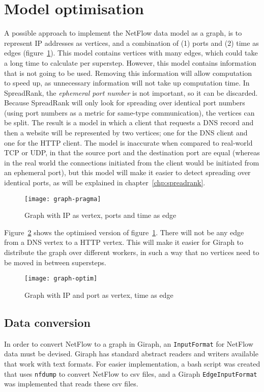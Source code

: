 \section{Model optimisation}
\label{sec:model_optimisation}

A possible approach to implement the NetFlow data model as a graph, is to represent IP addresses as vertices, and a combination of (1) ports and (2) time as edges (figure~\ref{fig:graph-pragma}).
This model contains vertices with many edges, which could take a long time to calculate per superstep.
However, this model contains information that is not going to be used.
Removing this information will allow computation to speed up, as unnecessary information will not take up computation time.
In SpreadRank, the \emph{\gls{ephemeral port} number} is not important,
 so it can be discarded.
Because SpreadRank will only look for \gls{spreading} over identical port numbers (using port numbers as a metric for same-type communication),
 the vertices can be split.
The result is a model in which a client that requests a DNS record and then a website will be represented by two vertices;
 one for the DNS client and one for the HTTP client.
The model is inaccurate when compared to real-world TCP or UDP, in that the source port and the destination port are equal
 (whereas in the real world the connections initiated from the client would be initiated from an \gls{ephemeral port}),
 but this model will make it easier to detect \gls{spreading} over identical ports, as will be explained in chapter~\ref{chp:spreadrank}.

\begin{figure}[h]
	\caption{Graph with IP as vertex, ports and time as edge}
	\label{fig:graph-pragma}
	\centering
		\texttt{[image: graph-pragma]}
\end{figure}

Figure~\ref{fig:graph-optim} shows the optimised version of figure~\ref{fig:graph-pragma}.
There will not be any edge from a DNS vertex to a HTTP vertex.
This will make it easier for Giraph to distribute the graph over different workers,
 in such a way that no vertices need to be moved in between supersteps.

\begin{figure}[h]
	\caption{Graph with IP and port as vertex, time as edge}
	\label{fig:graph-optim}
	\centering
		\texttt{[image: graph-optim]}
\end{figure}


\subsection{Data conversion}
\label{sec:conversion}
In order to convert NetFlow to a graph in Giraph,
 an \verb"InputFormat" for NetFlow data must be devised.
Giraph has standard abstract readers and writers available that work with text formats.
For easier implementation, a \gls{bash} script was created that uses \verb"nfdump" to convert NetFlow to \gls{csv} files,
 and a Giraph \verb"EdgeInputFormat" was implemented that reads these \gls{csv} files.

